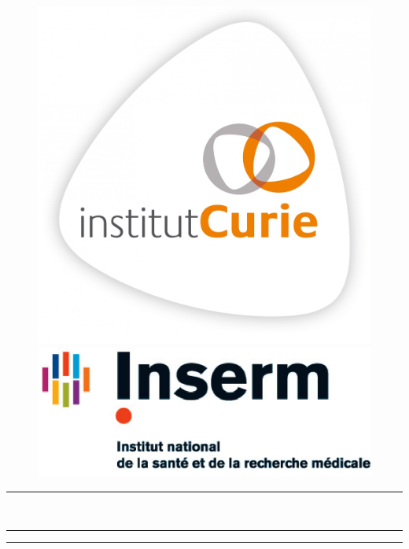 \documentclass[a4paper,10pt,twocolumn]{article}
\begin{document}
\begin{titlepage}
\begin{flushright}
\begin{figure}[!ht]
  \includegraphics[width=\linewidth]{CURIE.jpg}
\endminipage\hfill
{}%
  \includegraphics[width=\linewidth]{INSERM.jpg}
\endminipage
\end{figure}
 \end{flushright}


 

\noindent

\begin{center}

\textcolor{mycolor}{\rule{19cm}{0.6pt}}\\
\vspace{0.1cm}
\hrule height 2pt
\vspace{0.1cm}
\textcolor{mycolor}{\rule{19cm}{0.6pt}}\\
\end{center}


\end{titlepage}
\end{document}
